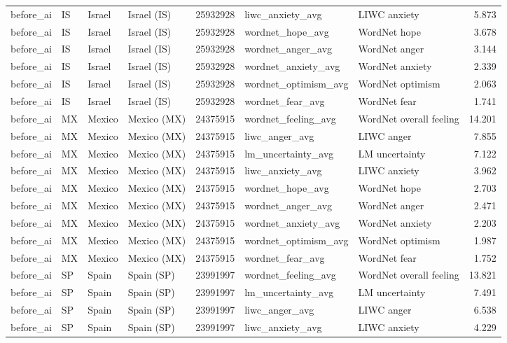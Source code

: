 \begin{tabular}{llllrllr}
before\_ai & IS & Israel & Israel (IS) & 25932928 & liwc\_anxiety\_avg & LIWC anxiety & 5.873 \\
before\_ai & IS & Israel & Israel (IS) & 25932928 & wordnet\_hope\_avg & WordNet hope & 3.678 \\
before\_ai & IS & Israel & Israel (IS) & 25932928 & wordnet\_anger\_avg & WordNet anger & 3.144 \\
before\_ai & IS & Israel & Israel (IS) & 25932928 & wordnet\_anxiety\_avg & WordNet anxiety & 2.339 \\
before\_ai & IS & Israel & Israel (IS) & 25932928 & wordnet\_optimism\_avg & WordNet optimism & 2.063 \\
before\_ai & IS & Israel & Israel (IS) & 25932928 & wordnet\_fear\_avg & WordNet fear & 1.741 \\
before\_ai & MX & Mexico & Mexico (MX) & 24375915 & wordnet\_feeling\_avg & WordNet overall feeling & 14.201 \\
before\_ai & MX & Mexico & Mexico (MX) & 24375915 & liwc\_anger\_avg & LIWC anger & 7.855 \\
before\_ai & MX & Mexico & Mexico (MX) & 24375915 & lm\_uncertainty\_avg & LM uncertainty & 7.122 \\
before\_ai & MX & Mexico & Mexico (MX) & 24375915 & liwc\_anxiety\_avg & LIWC anxiety & 3.962 \\
before\_ai & MX & Mexico & Mexico (MX) & 24375915 & wordnet\_hope\_avg & WordNet hope & 2.703 \\
before\_ai & MX & Mexico & Mexico (MX) & 24375915 & wordnet\_anger\_avg & WordNet anger & 2.471 \\
before\_ai & MX & Mexico & Mexico (MX) & 24375915 & wordnet\_anxiety\_avg & WordNet anxiety & 2.203 \\
before\_ai & MX & Mexico & Mexico (MX) & 24375915 & wordnet\_optimism\_avg & WordNet optimism & 1.987 \\
before\_ai & MX & Mexico & Mexico (MX) & 24375915 & wordnet\_fear\_avg & WordNet fear & 1.752 \\
before\_ai & SP & Spain & Spain (SP) & 23991997 & wordnet\_feeling\_avg & WordNet overall feeling & 13.821 \\
before\_ai & SP & Spain & Spain (SP) & 23991997 & lm\_uncertainty\_avg & LM uncertainty & 7.491 \\
before\_ai & SP & Spain & Spain (SP) & 23991997 & liwc\_anger\_avg & LIWC anger & 6.538 \\
before\_ai & SP & Spain & Spain (SP) & 23991997 & liwc\_anxiety\_avg & LIWC anxiety & 4.229 \\

\end{tabular}
